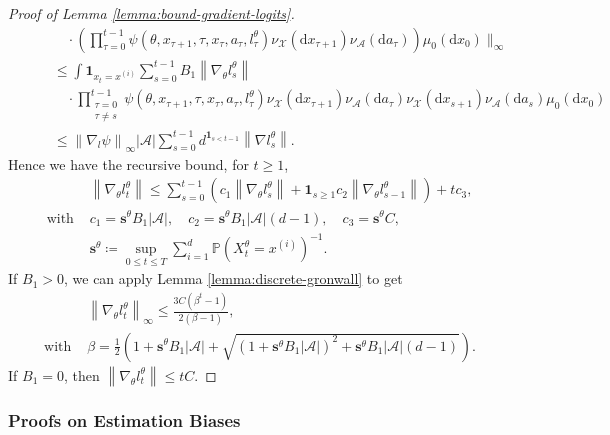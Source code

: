 \documentclass[11pt]{article}
\numberwithin{equation}{section}
\theoremstyle{definition}
\theoremstyle{remark}
\def\cA{\mathcal{A}}
\def\cX{\mathcal{X}}
\def\d{{\mathrm{d}}}
\begin{document}
\begin{proof}[Proof of Lemma \ref{lemma:bound-gradient-logits}]
\[\begin{aligned}
    &\qquad \quad \cdot \left(\prod_{\tau = 0}^{t - 1} \psi(\theta, x_{\tau+1}, \tau,x_\tau, a_\tau, l_\tau^\theta) \nu_\cX (\d x_{\tau + 1}) \nu_\cA (\d a_\tau) \right) \mu_0(\d x_0) \Bigg\|_\infty\\
    &\qquad  \leq \int \mathbf 1_{x_t = x^{(i)}} \sum_{s=0}^{t-1} B_1 \left\| \nabla_\theta l_s^\theta \right\| \\ 
    & \qquad \quad \cdot \prod_{\substack{\tau = 0 \\ \tau \neq s}}^{t - 1} \psi(\theta, x_{\tau+1}, \tau,x_\tau, a_\tau, l_\tau^\theta) \nu_\cX (\d x_{\tau + 1}) \nu_\cA (\d a_\tau)  
    \nu_\cX (\d x_{s + 1}) \nu_\cA (\d a_s) \mu_0(\d x_0) \\
    &\qquad \leq  \left\| \nabla_l \psi \right\|_\infty | \cA | \sum_{s=0}^{t-1} d^{\mathbf 1_{s < t - 1}} \left\| \nabla l_s^\theta \right\|.
\end{aligned}
\]
Hence we have the recursive bound, for $t \geq 1$,
\[
\begin{aligned}
    &\left\| \nabla_\theta l_t^\theta \right\| \leq  \sum_{s = 0}^{t-1} \left(c_1 \left\| \nabla_\theta l_s^\theta \right\| + \mathbf 1_{s \geq 1} c_2 \left\| \nabla_\theta l_{s-1}^\theta   \right\| \right)   + t c_3, \\
    \text{with } &c_1 = \mathbf s^\theta B_1 | \cA | , \quad c_2 = \mathbf s^\theta B_1| \cA | (d - 1), \quad c_3 = \mathbf s^\theta C, \\
    & \mathbf s^\theta \coloneq \sup_{0 \leq t \leq T} \sum_{i=1}^d \mathbb P (X_t^\theta = x^{(i)})^{-1}.
\end{aligned}
\]
If $ B_1  > 0$, we can apply Lemma \ref{lemma:discrete-gronwall} to get
\[
\begin{aligned}
&\left\| \nabla_\theta l_t^\theta \right\|_\infty \leq \frac{3 C(\beta^t - 1)}{2(\beta - 1)}, \\
\text{with } &\beta = \frac{1}{2} \left( 1 + \mathbf s^\theta B_1 | \cA | + \sqrt{(1 + \mathbf s^\theta B_1| \cA |)^2 + \mathbf s^\theta B_1 | \cA | (d - 1)} \right).
\end{aligned}
\]
If $ B_1 = 0$, then $\left\| \nabla_\theta l_t^\theta \right\| \leq t C$.
\end{proof}


\subsubsection{Proofs on Estimation Biases}
\end{document}
